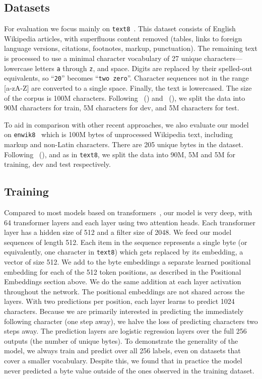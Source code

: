\subsection{Datasets}

For evaluation we focus mainly on \texttt{text8}~\cite{mahoney}.
This dataset consists of English Wikipedia articles, with superfluous content removed (tables, links to foreign language versions, citations, footnotes, markup, punctuation). The remaining text is processed to use a minimal character vocabulary of 27 unique characters---lowercase letters \texttt{a} through \texttt{z}, and space. Digits are replaced by their spelled-out equivalents, so ``\texttt{20}'' becomes ``\texttt{two zero}''. Character sequences not in the range [a-zA-Z] are converted to a single space. Finally, the text is lowercased. The size of the corpus is 100M characters. Following \citeauthor{mikolov2012subword}~(\citeyear{mikolov2012subword}) and \citeauthor{zhang2016architectural}~(\citeyear{zhang2016architectural}), we split the data into 90M characters for train, 5M characters for dev, and 5M characters for test.

To aid in comparison with other recent approaches, we also evaluate our model on \texttt{enwik8}~\cite{mahoney} which is 100M bytes of unprocessed Wikipedia text, including markup and non-Latin characters. There are 205 unique bytes in the dataset. Following \citeauthor{chung2015gated}~(\citeyear{chung2015gated}), and as in \texttt{text8}, we split the data into 90M, 5M and 5M for training, dev and test respectively.

\subsection{Training}

Compared to most models based on transformers~\cite{NIPS2017_7181,DBLP:journals/corr/abs-1803-05573}, our model is very deep, with 64 transformer layers and each layer using two attention heads. Each transformer layer has a hidden size of 512 and a filter size of 2048. We feed our model sequences of length 512. Each item in the sequence represents a single byte (or equivalently, one character in \texttt{text8}) which gets replaced by its embedding, a vector of size 512. We add to the byte embeddings a separate learned positional embedding for each of the 512 token positions, as described in the Positional Embeddings section above. We do the same addition at each layer activation throughout the network. The positional embeddings are not shared across the layers. With two predictions per position, each layer learns to predict 1024 characters. Because we are primarily interested in predicting the immediately following character (one step away), we halve the loss of predicting characters two steps away. The prediction layers are logistic regression layers over the full 256 outputs (the number of unique bytes). To demonstrate the generality of the model, we always train and predict over all 256 labels, even on datasets that cover a smaller vocabulary. Despite this, we found that in practice the model never predicted a byte value outside of the ones observed in the training dataset.

